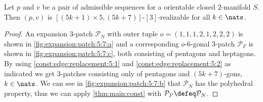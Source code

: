 \begin{theorem}
  Let $p$ and $v$ be a pair of admissible sequences for a orientable closed $2$-manifold $S$. Then $(p, v)$ is $[(5k + 1) \times 5, (5k+7)]$-$[3]$-realizable for all $k \in \nats$.
  \begin{proof}
    An expansion $3$-patch $\mathcal{P}_N$ with outer tuple $o = (1, 1, 1, 2, 1, 2, 2, 2)$ is shown in \autoref{fig:expansion:patch:5:7:a} and a corresponding $o$-$6$-gonal $3$-patch $\mathcal{P}_F$ is shown in \autoref{fig:expansion:patch:5:7:c}, both consisting of pentagons and heptagons. By using \autoref{const:edge:replacement:5:1} and \autoref{const:edge:replacement:5:2} as indicated we get $3$-patches consisting only of pentagons and $(5k+7)$-gons, $k \in \nats$. We can see in \autoref{fig:expansion:patch:5:7:b} that $\mathcal{P}_N$ has the polyhedral property, thus we can apply \autoref{thm:main:const} with $\mathcal{P}_P \defeq \mathcal{P}_N$.
  \end{proof}%
\end{theorem}%

